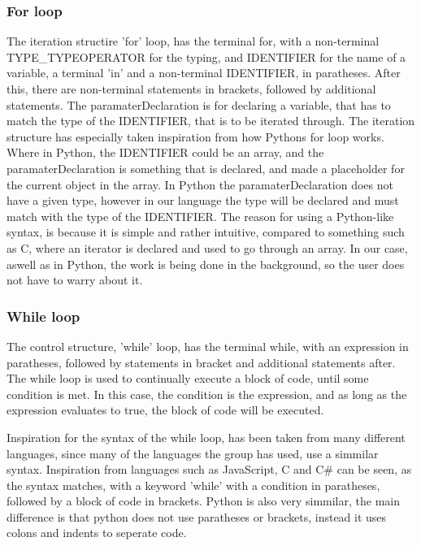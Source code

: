 \subsubsection{For loop}
The iteration structire 'for' loop, has the terminal for, with a non-terminal TYPE\_TYPEOPERATOR for the typing, and IDENTIFIER for the name of a variable, a terminal 'in' and a non-terminal IDENTIFIER, in paratheses. After this, there are non-terminal statements in brackets, followed by additional statements.
The paramaterDeclaration is for declaring a variable, that has to match the type of the IDENTIFIER, that is to be iterated through.
The iteration structure has especially taken inspiration from how Pythons for loop works. Where in Python, the IDENTIFIER could be an array, and the paramaterDeclaration is something that is declared, and made a placeholder for the current object in the array. In Python the paramaterDeclaration does not have a given type, however in our language the type will be declared and must match with the type of the IDENTIFIER. The reason for using a Python-like syntax, is because it is simple and rather intuitive, compared to something such as C, where an iterator is declared and used to go through an array. In our case, aswell as in Python, the work is being done in the background, so the user does not have to warry about it.


\subsubsection{While loop}
The control structure,  'while' loop, has the terminal while, with an expression in paratheses, followed by statements in bracket and additional statements after.
The while loop is used to continually execute a block of code, until some condition is met. In this case, the condition is the expression, and as long as the expression evaluates to true, the block of code will be executed.

Inspiration for the syntax of the while loop, has been taken from many different languages, since many of the languages the group has used, use a simmilar syntax. Inspiration from languages such as JavaScript, C and C\# can be seen, as the syntax matches, with a keyword 'while' with a condition in paratheses, followed by a block of code in brackets. Python is also very simmilar, the main difference is that python does not use paratheses or brackets, instead it uses colons and indents to seperate code.

